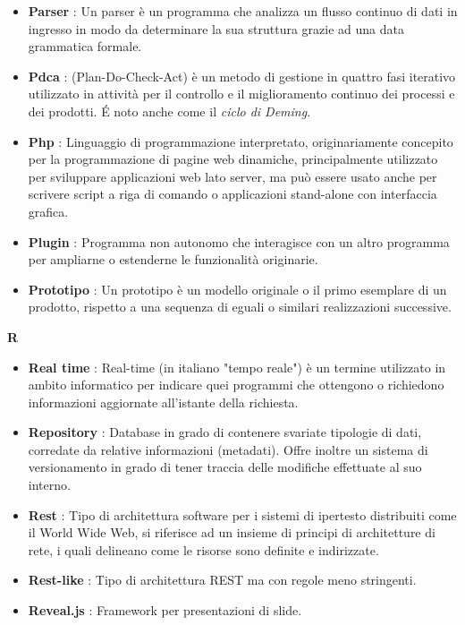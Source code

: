 \begin{flushleft}
\begin{itemize}[label={}]
\item \textbf{Parser} : Un parser è un programma che analizza un flusso continuo di dati in ingresso in modo da determinare la sua struttura grazie ad una data grammatica formale.
\item \textbf{Pdca} : (Plan-Do-Check-Act) è un metodo di gestione in quattro fasi iterativo utilizzato in attività per il controllo e il miglioramento continuo dei processi e dei prodotti. \'E noto anche come il \textit{ciclo di Deming}.
\item \textbf{Php} : Linguaggio di programmazione interpretato, originariamente concepito per la programmazione di pagine web dinamiche, principalmente utilizzato per sviluppare applicazioni web lato server, ma può essere usato anche per scrivere script a riga di comando o applicazioni stand-alone con interfaccia grafica.
\item \textbf{Plugin} : Programma non autonomo che interagisce con un altro programma per ampliarne o estenderne le funzionalità originarie.
\item \textbf{Prototipo} : Un prototipo è un modello originale o il primo esemplare di un prodotto, rispetto a una sequenza di eguali o similari realizzazioni successive.
\end{itemize}
\end{flushleft}
\newpage
{\huge \textbf{R}}
\begin{flushleft}
\begin{itemize}[label={}]
\item \textbf{Real time} : Real-time (in italiano "tempo reale") è un termine utilizzato in ambito informatico per indicare quei programmi che ottengono o richiedono informazioni aggiornate all'istante della richiesta.
\item \textbf{Repository} : Database in grado di contenere svariate tipologie di dati, corredate da relative informazioni (metadati). Offre inoltre un sistema di versionamento in grado di tener traccia delle modifiche effettuate al suo interno.
\item \textbf{Rest} : Tipo di architettura software per i sistemi di ipertesto distribuiti come il World Wide Web, si riferisce ad un insieme di principi di architetture di rete, i quali delineano come le risorse sono definite e indirizzate.
\item \textbf{Rest-like} : Tipo di architettura REST ma con regole meno stringenti.
\item \textbf{Reveal.js} : Framework per presentazioni di slide.
\end{itemize}
\end{flushleft}

